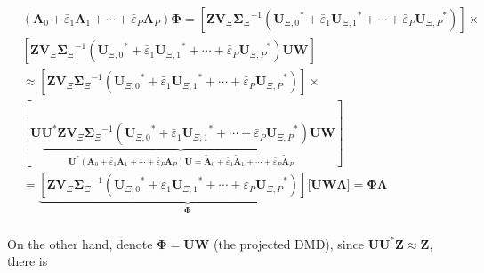 \begin{equation}
    \begin{aligned}
    & (\mathbf{A}_{0}+{\bar{\varepsilon}_{1}}{\mathbf{A}_{1}}+\cdots+{\bar{\varepsilon}_{P}}{\mathbf{A}_{P}})\mathbf{\Phi}=[\mathbf{Z}{\mathbf{V}_{\Xi}}{\mathbf{\Sigma}_{\Xi}}^{-1}({\mathbf{U}_{\Xi,0}}^\text{*}+{\bar{\varepsilon}_{1}}{\mathbf{U}_{\Xi,1}}^\text{*}+\cdots+{\bar{\varepsilon}_{P}}{\mathbf{U}_{\Xi,P}}^\text{*})]\times  \\ 
    & [\mathbf{Z}{\mathbf{V}_{\Xi}}{\mathbf{\Sigma}_{\Xi}}^{-1}({\mathbf{U}_{\Xi,0}}^\text{*}+{\bar{\varepsilon}_{1}}{\mathbf{U}_{\Xi,1}}^\text{*}+\cdots+{\bar{\varepsilon}_{P}}{\mathbf{U}_{\Xi,P}}^\text{*})\mathbf{UW}] \\ 
    & \approx [\mathbf{Z}{\mathbf{V}_{\Xi}}{\mathbf{\Sigma}_{\Xi}}^{-1}({\mathbf{U}_{\Xi,0}}^\text{*}+{\bar{\varepsilon}_{1}}{\mathbf{U}_{\Xi,1}}^\text{*}+\cdots+{\bar{\varepsilon}_{P}}{\mathbf{U}_{\Xi,P}}^\text{*})]\times \\ 
    & [\mathbf{U}\underbrace{{\mathbf{U}^\text{*}}\mathbf{Z}{\mathbf{V}_{\Xi}}{\mathbf{\Sigma}_{\Xi}}^{-1}({\mathbf{U}_{\Xi,0}}^\text{*}+{\bar{\varepsilon}_{1}}{\mathbf{U}_{\Xi,1}}^\text{*}+\cdots+{\bar{\varepsilon}_{P}}{\mathbf{U}_{\Xi,P}}^\text{*})\mathbf{U}}_{{\mathbf{U}^\text{*}}({\mathbf{A}_{0}}+{\bar{\varepsilon}_{1}}{\mathbf{A}_{1}}+\cdots+{\bar{\varepsilon}_{P}}{\mathbf{A}_{P}})\mathbf{U}=\mathbf{\tilde{A}}_{0}+{\bar{\varepsilon}_{1}}{\mathbf{\tilde{A}}_{1}}+\cdots+{\bar{\varepsilon}_{P}}{{\mathbf{\tilde{A}}}_{P}}}\mathbf{W}] \\ 
    & =\underbrace{[\mathbf{Z}{\mathbf{V}_{\Xi}}{\mathbf{\Sigma}_{\Xi}}^{-1}({\mathbf{U}_{\Xi,0}}^\text{*}+{\bar{\varepsilon}_{1}}{\mathbf{U}_{\Xi,1}}^\text{*}+\cdots+{\bar{\varepsilon}_{P}}{\mathbf{U}_{\Xi,P}}^\text{*})][\mathbf{UW}}_{\mathbf{\Phi}}\mathbf{\Lambda}]=\mathbf{\Phi \Lambda} \\ 
    \end{aligned} \label{eqS13}
\end{equation}

On the other hand, denote $\mathbf{\Phi }=\mathbf{UW}$ (the projected DMD), since $\mathbf{U}{\mathbf{U}^\text{*}}\mathbf{Z}\approx \mathbf{Z}$, there is

